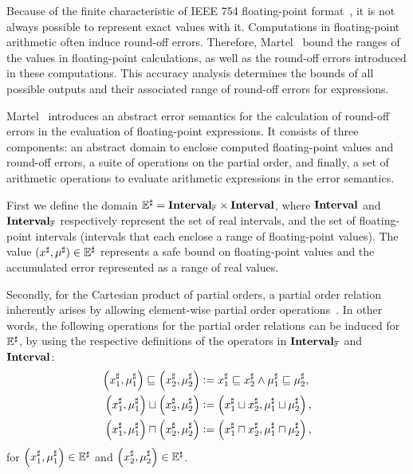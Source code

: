 Because of the finite characteristic of IEEE 754 floating-point
format~\cite{ieee754}, it is not always possible to represent exact values
with it.  Computations in floating-point arithmetic often induce round-off
errors.  Therefore, Martel~\cite{martel07} bound the ranges of the values
in floating-point calculations, as well as the round-off errors introduced
in these computations.  This accuracy analysis determines the bounds of
all possible outputs and their associated range of round-off errors for
expressions.

Martel~\cite{martel07} introduces an abstract error semantics for the
calculation of round-off errors in the evaluation of floating-point
expressions.  It consists of three components: an abstract domain to enclose
computed floating-point values and round-off errors, a suite of operations on
the partial order, and finally, a set of arithmetic operations to evaluate
arithmetic expressions in the error semantics.

First we define the domain $\mathbb{E}^\sharp = \mathbf{Interval}_\mathbb{F}\times\mathbf{Interval}$,
where $\mathbf{Interval}$ and $\mathbf{Interval}_\mathbb{F}$ respectively represent the
set of real intervals, and the set of floating-point intervals (intervals
that each enclose a range of floating-point values).  The value $(x^\sharp,
\mu^\sharp) \in \mathbb{E}^\sharp$ represents a safe bound on floating-point
values and the accumulated error represented as a range of real values.

Secondly, for the Cartesian product of partial orders, a partial order
relation inherently arises by allowing element-wise partial order
operations~\cite{abramsky94}.  In other words, the following operations for the
partial order relations can be induced for $\mathbb{E}^\sharp$, by using the respective
definitions of the operators in $\mathbf{Interval}_\mathbb{F}$ and $\mathbf{Interval}$:
\begin{equation}
    \begin{aligned}
        \left( x^\sharp_1, \mu^\sharp_1 \right) \sqsubseteq
        \left( x^\sharp_2, \mu^\sharp_2 \right)
        &\vcentcolon=
            x^\sharp_1 \sqsubseteq x^\sharp_2 \wedge
            \mu^\sharp_1 \sqsubseteq \mu^\sharp_2, \\
        \left( x^\sharp_1, \mu^\sharp_1 \right) \sqcup
        \left( x^\sharp_2, \mu^\sharp_2 \right)
        &\vcentcolon=
            \left( x^\sharp_1 \sqcup x^\sharp_2,
              \mu^\sharp_1 \sqcup \mu^\sharp_2 \right), \\
        \left( x^\sharp_1, \mu^\sharp_1 \right) \sqcap
        \left( x^\sharp_2, \mu^\sharp_2 \right)
        &\vcentcolon=
            \left( x^\sharp_1 \sqcap x^\sharp_2,
              \mu^\sharp_1 \sqcap \mu^\sharp_2 \right),
    \end{aligned}
\end{equation}
for $\left( x^\sharp_1, \mu^\sharp_1 \right) \in \mathbb{E}^\sharp$ and
$\left( x^\sharp_2, \mu^\sharp_2 \right) \in \mathbb{E}^\sharp$.

